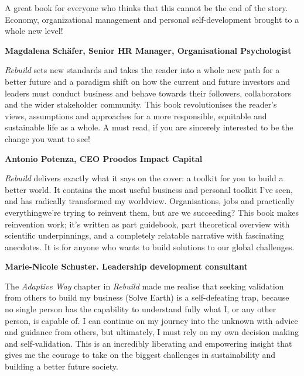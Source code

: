 ﻿\noindent A great book for everyone who thinks that this cannot be the end of the story. Economy, organizational management and personal self-development brought to a whole new level!


{\raggedleft \textemdash \textbf{Magdalena Sch{\"a}fer, Senior HR Manager, Organisational Psychologist}}
\vspace{1.5ex}


\noindent \emph{Rebuild} sets new standards and takes the reader into a whole new path for a better future and a paradigm shift on how the current and future investors and leaders must conduct business and behave towards their followers, collaborators and the wider stakeholder community. This book revolutionises the reader's views, assumptions and approaches for a more responsible, equitable and sustainable life as a whole. A must read, if you are sincerely interested to be the change you want to see!


{\raggedleft \textemdash \textbf{Antonio Potenza, CEO Proodos Impact Capital}}
\vspace{1.5ex}


\noindent \emph{Rebuild} delivers exactly what it says on the cover: a toolkit for you to build a better world. It contains the most useful business and personal toolkit I’ve seen, and has radically transformed my worldview. Organisations, jobs and practically everything\textemdash we're trying to reinvent them, but are we succeeding? This book makes reinvention work; it's written as part guidebook, part theoretical overview with scientific underpinnings, and a completely relatable narrative with fascinating anecdotes. It is for anyone who wants to build solutions to our global challenges. 
 
 {\raggedleft \textemdash \textbf{Marie-Nicole Schuster. Leadership development consultant}}
\vspace{1.5ex}




\noindent The \emph{Adaptive Way} chapter in \emph{Rebuild} made me realise that seeking validation from others to build my business (Solve Earth) is a self-defeating trap, because no single person has the capability to understand fully what I, or any other person, is capable of. I can continue on my journey into the unknown with advice and guidance from others, but ultimately, I must rely on my own decision making and self-validation. This is an incredibly liberating and empowering insight that gives me the courage to take on the biggest challenges in sustainability and building a better future society.


